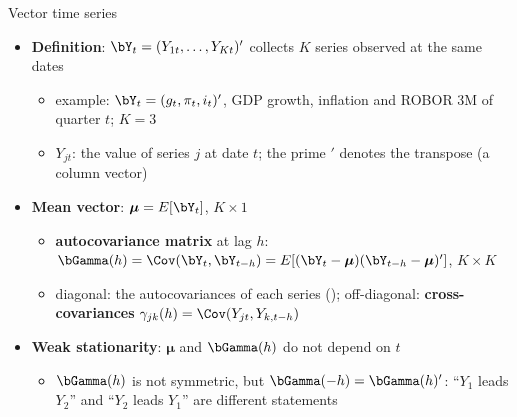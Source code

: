 \begin{frame}{Vector time series}
\itemsize{\small}
\begin{itemize}
    \item \textbf{Definition}: $\bY_t = (Y_{1t}, \dots, Y_{Kt})'$ collects $K$ series observed at the same dates
    \begin{itemize}
        \item example: $\bY_t = (g_t, \pi_t, i_t)'$, GDP growth, inflation and ROBOR 3M of quarter $t$; $K = 3$
        \item $Y_{jt}$: the value of series $j$ at date $t$; the prime $'$ denotes the transpose (a column vector)
    \end{itemize}
    \item \textbf{Mean vector}: $\boldsymbol{\mu} = E[\bY_t]$, $K \times 1$
    \begin{itemize}
        \item \textbf{autocovariance matrix} at lag $h$: $\bGamma(h) = \Cov(\bY_t, \bY_{t-h}) = E[(\bY_t - \boldsymbol{\mu})(\bY_{t-h} - \boldsymbol{\mu})']$, $K \times K$
        \item diagonal: the autocovariances of each series (); off-diagonal: \textbf{cross-covariances} $\gamma_{jk}(h) = \Cov(Y_{jt}, Y_{k,t-h})$
    \end{itemize}
    \item \textbf{Weak stationarity}: $\boldsymbol{\mu}$ and $\bGamma(h)$ do not depend on $t$
    \begin{itemize}
        \item $\bGamma(h)$ is not symmetric, but $\bGamma(-h) = \bGamma(h)'$: ``$Y_1$ leads $Y_2$'' and ``$Y_2$ leads $Y_1$'' are different statements
    \end{itemize}
\end{itemize}
\end{frame}

